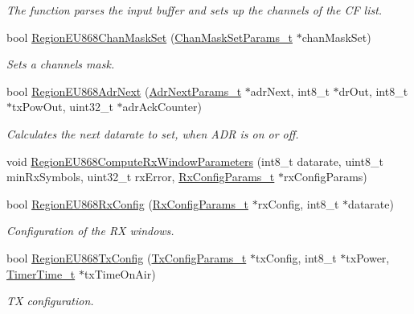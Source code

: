 \begin{DoxyCompactItemize}
\begin{DoxyCompactList}\small\item\em The function parses the input buffer and sets up the channels of the CF list. \end{DoxyCompactList}\item 
bool \hyperlink{group__REGIONEU868_ga8c63acfe556cf427ba83e5429f2ec1d9}{Region\+E\+U868\+Chan\+Mask\+Set} (\hyperlink{group__REGION_ga6d24f7da136006410827dfb29f6b9b9e}{Chan\+Mask\+Set\+Params\+\_\+t} $\ast$chan\+Mask\+Set)
\begin{DoxyCompactList}\small\item\em Sets a channels mask. \end{DoxyCompactList}\item 
bool \hyperlink{group__REGIONEU868_gaa93c92348ce901ace20e766be0be1941}{Region\+E\+U868\+Adr\+Next} (\hyperlink{group__REGION_ga567c2742622326b350b4e91bbf61b4ce}{Adr\+Next\+Params\+\_\+t} $\ast$adr\+Next, int8\+\_\+t $\ast$dr\+Out, int8\+\_\+t $\ast$tx\+Pow\+Out, uint32\+\_\+t $\ast$adr\+Ack\+Counter)
\begin{DoxyCompactList}\small\item\em Calculates the next datarate to set, when A\+DR is on or off. \end{DoxyCompactList}\item 
void \hyperlink{group__REGIONEU868_ga7650d2866d0b5df186afd4c0dd1f52bb}{Region\+E\+U868\+Compute\+Rx\+Window\+Parameters} (int8\+\_\+t datarate, uint8\+\_\+t min\+Rx\+Symbols, uint32\+\_\+t rx\+Error, \hyperlink{group__REGION_ga375c038078dfcfc7ef14280021db719e}{Rx\+Config\+Params\+\_\+t} $\ast$rx\+Config\+Params)
\item 
bool \hyperlink{group__REGIONEU868_gae57b8f1a0b5e45ab2371fbc0737322a7}{Region\+E\+U868\+Rx\+Config} (\hyperlink{group__REGION_ga375c038078dfcfc7ef14280021db719e}{Rx\+Config\+Params\+\_\+t} $\ast$rx\+Config, int8\+\_\+t $\ast$datarate)
\begin{DoxyCompactList}\small\item\em Configuration of the RX windows. \end{DoxyCompactList}\item 
bool \hyperlink{group__REGIONEU868_ga7cab7daedc2b01b688d4e2cfb0a30029}{Region\+E\+U868\+Tx\+Config} (\hyperlink{group__REGION_gabed730d4d04b0b60d4b6d1966d3f21d3}{Tx\+Config\+Params\+\_\+t} $\ast$tx\+Config, int8\+\_\+t $\ast$tx\+Power, \hyperlink{utilities_8h_a4215ca43d3e953099ea758ce428599d0}{Timer\+Time\+\_\+t} $\ast$tx\+Time\+On\+Air)
\begin{DoxyCompactList}\small\item\em TX configuration. \end{DoxyCompactList}\item 

\end{DoxyCompactItemize}
